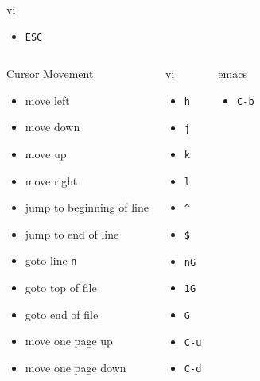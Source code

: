 \documentclass[slidestop,mathserif,compress,xcolor=svgnames]{beamer}
\newenvironment{eblock}[0]
{
\begin{beamerboxesrounded}[upper=uppercol2,lower=lowercol2,shadow=true]}
{\end{beamerboxesrounded}}
\begin{document}
\begin{frame}[allowframebreaks]
{\begin{columns}
\begin{eblock}{vi}
\begin{itemize}
      \item \texttt{ESC}
    \end{itemize}
    \end{eblock}
  \end{columns}
  }
  \framebreak
  \vspace{-0.6cm}
  {\scriptsize
  \begin{columns}
    \begin{eblock}{Cursor Movement}
    \begin{itemize}
      \item move left 
      \item move down
      \item move up
      \item move right
      \item jump to beginning of line
      \item jump to end of line
      \item goto line \texttt{n}
      \item goto top of file
      \item goto end of file
      \item move one page up
      \item move one page down
    \end{itemize}
    \end{eblock}
    \begin{eblock}{vi}
    \begin{itemize}
      \item \texttt{h}
      \item \texttt{j}
      \item \texttt{k}
      \item \texttt{l}
      \item \texttt{\^}
      \item \texttt{\$}
      \item \texttt{nG}
      \item \texttt{1G}
      \item \texttt{G}
      \item \texttt{C-u}
      \item \texttt{C-d}
    \end{itemize}
    \end{eblock}
    \begin{eblock}{emacs}
    \begin{itemize}
      \item \texttt{C-b}

\end{itemize}
\end{eblock}
\end{columns}}
\end{frame}
\end{document}
